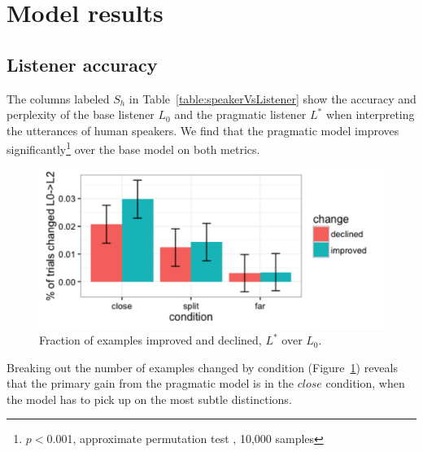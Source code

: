 \documentclass[11pt,letterpaper]{article}
\newcommand{\Listener}{L}
\newcommand{\Speaker}{S}
\renewcommand{\|}{\mid}
\newcommand{\figref}[1]{Figure~\ref{#1}}
\newcommand{\tabref}[1]{Table~\ref{#1}}
\begin{document}
\section{Model results}

\subsection{Listener accuracy}

The columns labeled $\Speaker_h$ in \tabref{table:speakerVsListener} show the accuracy
and perplexity of the base listener $\Listener_0$ and the pragmatic listener
$\Listener^*$ when interpreting the utterances of human speakers. We find that the
pragmatic model improves significantly\footnote{$p <{}$0.001, approximate
permutation test \cite{Pado2006}, 10,000 samples} over the base model on both metrics.

\begin{figure}
\centering
\includegraphics[scale = .45]{figures/changedByCondition.pdf}
\caption{Fraction of examples improved and declined, $\Listener^*$ over $\Listener_0$.}
\label{fig:changedByCondition}
\end{figure}

Breaking out the number of examples changed by condition
(\figref{fig:changedByCondition}) reveals that
the primary gain from the pragmatic model is in the $close$ condition, when the
model has to pick up on the most subtle distinctions.
\end{document}
